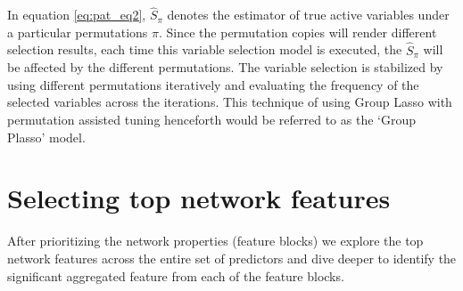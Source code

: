 In equation \eqref{eq:pat_eq2}, $\hat S_{\pi}$ denotes the estimator of true active variables under a particular permutations $\pi$. Since the permutation copies will render different selection results, each time this variable selection model is executed, the $\hat S_{\pi}$ will be affected by the different permutations. The variable selection is stabilized by using different permutations iteratively and evaluating the frequency of the selected variables across the iterations. This technique of using Group Lasso with permutation assisted tuning henceforth would be referred to as the \lq Group Plasso' model.

\section{Selecting top network features}\label{sec:selectntw}
After prioritizing the network properties (feature blocks) we explore the top network features across the entire set of predictors and dive deeper to identify the significant aggregated feature from each of the feature blocks.

